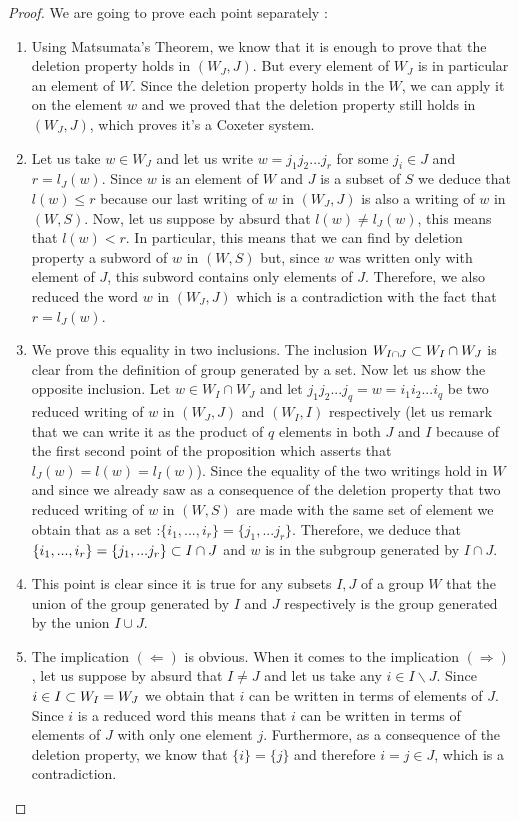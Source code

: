 \begin{proof}
	We are going to prove each point separately :
	\begin{enumerate}
		\item Using Matsumata's Theorem, we know that it is enough to prove that the deletion property holds in $(W_J,J)$. But every element of $W_J$ is in particular an element of $W$. Since the deletion property holds in the $W$, we can apply it on the element $w$ and we proved that the deletion property still holds in $(W_J,J)$, which proves it's a Coxeter system.
		\item Let us take $w\in W_J$ and let us write $w=j_1j_2...j_r$ for some $j_i\in J$ and $r=l_J(w)$. Since $w$ is an element of $W$ and $J$ is a subset of $S$ we deduce that $l(w)\leq r$ because our last writing of $w$ in $(W_J,J)$ is also a writing of $w$ in $(W,S)$. Now, let us suppose by absurd that $l(w)\not=l_J(w)$, this means that $l(w)<r$. In particular, this means that we can find by deletion property a subword of $w$ in $(W,S)$ but, since $w$ was written only with element of $J$, this subword contains only elements of $J$. Therefore, we also reduced the word $w$ in $(W_J,J)$ which is a contradiction with the fact that $r=l_J(w)$.
		\item We prove this equality in two inclusions. The inclusion $W_{I\cap J}\subset W_I\cap W_J $ is clear from the definition of group generated by a set. Now let us show the opposite inclusion. Let $w\in W_I\cap W_J$ and let $j_1j_2...j_q=w=i_1i_2...i_q$ be two reduced writing of $w$ in $(W_J,J)$ and $(W_I,I)$ respectively (let us remark that we can write it as the product of $q$ elements in both $J$ and $I$ because of the first second point of the proposition which asserts that $l_J(w)=l(w)=l_I(w)$). Since the equality of the two writings hold in $W$ and since we already saw as a consequence of the deletion property that two reduced writing of $w$ in $(W,S)$ are made with the same set of element we obtain that as a set :$\{i_1,...,i_r\}=\{j_1,...j_r\}$. Therefore, we deduce that $\{i_1,...,i_r\}=\{j_1,...j_r\}\subset I\cap J$ and $w$ is in the subgroup generated by $I\cap J$.
		\item This point is clear since it is true for any subsets $I,J$ of a group $W$ that the union of the group generated by $I$ and $J$ respectively is the group generated by the union $I\cup J$.
		\item The implication $(\Leftarrow)$ is obvious. When it comes to the implication $(\Rightarrow)$, let us suppose by absurd that $I\not=J$ and let us take any $i\in I\backslash J$. Since $i\in I\subset W_I=W_J$ we obtain that $i$ can be written in terms of elements of $J$. Since $i$ is a reduced word this means that $i$ can be written in terms of elements of $J$ with only one element $j$. Furthermore, as a consequence of the deletion property, we know that $\{i\}=\{j\}$ and therefore $i=j\in J$, which is a contradiction.
	\end{enumerate}
\end{proof}
